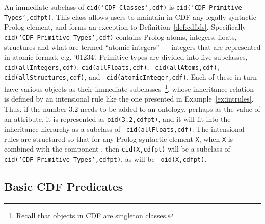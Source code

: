 An immediate subclass of {\tt cid('CDF Classes',cdf)} is {\tt cid('CDF
Primitive Types',cdfpt)}.  This class allows users to maintain in CDF
any legally syntactic Prolog element, and forms an exception to
Definition~\ref{def:cdfids}.  Specifically {\tt cid('CDF Primitive
Types',cdf)} contains Prolog atoms, integers, floats, structures and
what are termed ``atomic integers'' --- integers that are represented
in atomic format, e.g. '01234'.  Primitive types are divided into five
subclasses, {\tt cid(allIntegers,cdf)}, {\tt cid(allFloats,cdf)}, {\tt
cid(allAtoms,cdf)}, {\tt cid(allStructures,cdf)}, and {\tt
cid(atomicInteger,cdf)}.  Each of these in turn have various objects
as their immediate subclasses~\footnote{Recall that objects in CDF are
singleton classes.}, whose inheritance relation is defined by an
intensional rule like the one presented in Example~\ref{ex:intrules}.
Thus, if the number 3.2 needs to be added to an ontology, perhaps as
the value of an attribute, it is represented as {\tt oid(3.2,cdfpt)},
and it will fit into the inheritance hierarchy as a subclass of {\tt
cid(allFloats,cdf)}.  The intensional rules are structured so that for
any Prolog syntactic element {\tt X}, when {\tt X} is combined with
the component , then {\tt cid(X,cdfpt)} will be a
subclass of {\tt cid('CDF Primitive Types',cdfpt)}, as will be {\tt
oid(X,cdfpt)}.

\subsection{Basic CDF Predicates}

